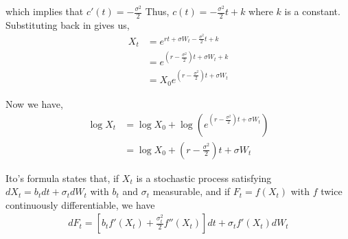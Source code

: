 \documentclass[12pt]{article}
\newenvironment{problem}[2][Problem]{\begin{trivlist}
\item[\hskip \labelsep {\bfseries #1}\hskip \labelsep {\bfseries #2.}]}{\end{trivlist}}
\begin{document}
which implies that $c'(t) = -\frac{\sigma^2}{2}$ Thus, $c(t) = -\frac{\sigma^2}{2}t + k$ where $k$ is a constant.\\

Substituting back in gives us,
\begin{align*}
X_t &= e^{rt + \sigma W_t - \frac{\sigma^2}{2}t + k}\\
&= e^{(r - \frac{\sigma^2}{2})t + \sigma W_t + k}\\
&= X_0 e^{(r - \frac{\sigma^2}{2})t + \sigma W_t}
\end{align*}

Now we have,
\begin{align*}
\log X_t &= \log X_0 + \log\left(e^{(r - \frac{\sigma^2}{2})t + \sigma W_t}\right)\\
&= \log X_0 + (r - \frac{\sigma^2}{2})t + \sigma W_t
\end{align*}

\begin{problem}{18}
\end{problem}


\begin{problem}{19}
\end{problem}

Ito's formula states that, if $X_t$ is a stochastic process satisfying $dX_t = b_tdt + \sigma_tdW_t$ with $b_t$ and $\sigma_t$ measurable, and if $F_t = f(X_t)$ with $f$ twice continuously differentiable, we have
\begin{align*}
dF_t = [b_tf'(X_t) + \frac{\sigma^2_t}{2} f''(X_t)]dt + \sigma_tf'(X_t)dW_t
\end{align*}
\end{document}
